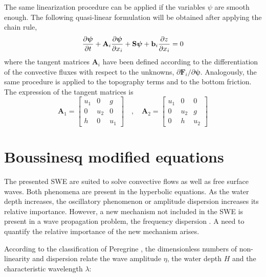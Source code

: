 The same linearization procedure can be applied if the variables $\psi$ are smooth enough. The following quasi-linear formulation will be obtained after applying the chain rule,
\begin{equation}
    \frac{\partial\bm\psi}{\partial t} + \mathbf{A}_i\frac{\partial\bm\psi}{\partial x_i} + \mathbf{S}\bm{\psi} + \mathbf{b}_i\frac{\partial z}{\partial x_i} = 0
\end{equation}
where the tangent matrices $\mathbf{A}_i$ have been defined according to the differentiation of the convective fluxes with respect to the unknowns, $\partial\mathbf{F}_i/\partial\bm{\psi}$. 
Analogously, the same procedure is applied to the topography terms and to the bottom friction. The expression of the tangent matrices is
\begin{equation}
    \mathbf{A}_1 = \left[\begin{array}{ccc}
        u_1 &  0  &  g  \\
         0  & u_2 &  0  \\
         h  &  0  & u_1
    \end{array}\right] \quad , \quad
    \mathbf{A}_2 = \left[\begin{array}{ccc}
        u_1 &  0  &  0  \\
         0  & u_2 &  g  \\
         0  &  h  & u_2
    \end{array}\right]
\end{equation}





\section{Boussinesq modified equations}


The presented SWE are suited to solve convective flows as well as free surface waves. Both phenomena are present in the hyperbolic equations. As the water depth increases, the oscillatory phenomenon or amplitude dispersion increases its relative importance.
However, a new mechanism not included in the SWE is present in a wave propagation problem, the frequency dispersion \cite{ursell1953}. A need to quantify the relative importance of the new mechanism arises.

According to the classification of Peregrine \cite{peregrine1967}, the dimensionless numbers of non-linearity and dispersion relate the wave amplitude $\eta$, the water depth $H$ and the characteristic wavelength $\lambda$:

